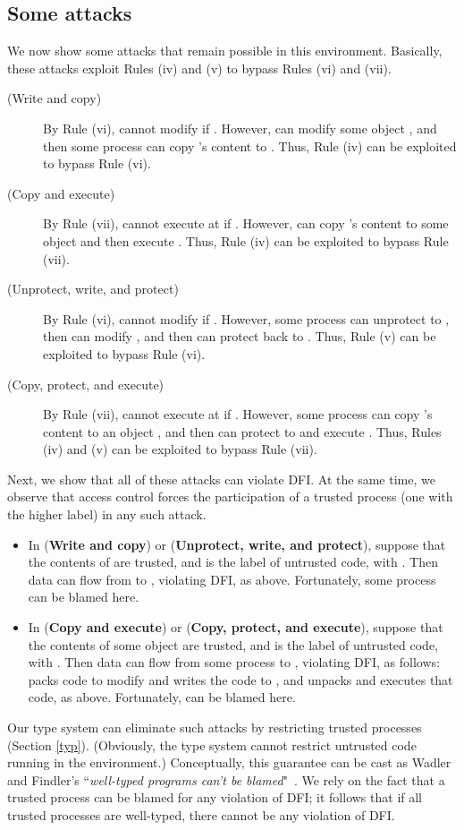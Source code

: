 \documentclass{sigplanconf}
\begin{document}
\subsection{Some attacks}\label{vista}
We now show some attacks that remain possible in this environment. Basically, these attacks exploit Rules (iv) and (v) to bypass Rules (vi) and (vii). \begin{description}
\item[{\rm (}Write and copy{\rm )}] By Rule (vi),  cannot
  modify  if . However,  can modify 
  some object , and then some process  can copy 's content to . Thus, Rule (iv) can be exploited to bypass Rule (vi).
\item[{\rm (}Copy and execute{\rm )}] By Rule (vii),  cannot
  execute  at  if . However,  can copy 's content to some object  and then execute . Thus, Rule (iv) can be exploited to bypass Rule (vii).
\item[{\rm (}Unprotect, write, and protect{\rm )}] By Rule (vi),  cannot
  modify  if . However, some process 
  can unprotect  to , then  can modify 
   , and then  can protect  back to . Thus, Rule (v) can be exploited to bypass Rule (vi).
\item[{\rm (}Copy, protect, and execute{\rm )}] By Rule (vii),  cannot
  execute  at  if . However, some process  can copy 's content to an object , and then  can protect
   to  and execute . Thus, Rules (iv) and (v) can be exploited to bypass Rule (vii).
\end{description}
Next, we show that all of these attacks can violate DFI. At the same time, we observe that access
control forces the participation of a trusted process (one with the higher label) in
any such attack. 
\begin{itemize}
\item In ({\bf Write and copy}) or ({\bf Unprotect, write, and protect}), suppose that the contents of  are trusted, and  is the label of untrusted code,  with . Then data can flow from  to , violating DFI, as above. Fortunately, some process  can be blamed here.
\item In ({\bf Copy and execute}) or ({\bf Copy, protect, and execute}), suppose that the contents of some object  are trusted, and  is the label of untrusted code, with . Then data can flow from some process   to , violating DFI, as follows:  packs code to modify  and writes the code to , and  unpacks and executes that code, as above. Fortunately,  can be blamed here.
\end{itemize}
Our type system can eliminate such attacks by restricting trusted processes (Section \ref{typ}).
(Obviously, the type system cannot restrict untrusted code running in the environment.) Conceptually, this guarantee can be cast as Wadler and Findler's ``\emph{well-typed programs can't be blamed}"~\cite{blame}. 
We rely on the fact that a trusted process can be blamed for any violation of DFI; it follows that if all trusted processes are well-typed, there cannot be any violation of DFI. 
\end{document}
